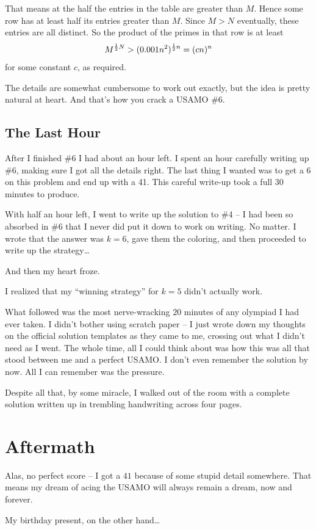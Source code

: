 \documentclass[11pt]{scrartcl}
\begin{document}
That means at the half the entries in the table are greater than $M$.
Hence some row has at least half its entries greater than $M$.
Since $M > N$ eventually, these entries are all distinct. So the product of the primes in that row is at least
\[ M^{\frac{1}{2} N} > (0.001n^2)^{\frac{1}{2} n} = (cn)^n \]
for some constant $c$, as required.

The details are somewhat cumbersome to work out exactly, but the idea is pretty natural at heart.
And that's how you crack a USAMO \#6.

\subsection{The Last Hour}
After I finished \#6 I had about an hour left.
I spent an hour carefully writing up \#6, making sure I got all the details right.
The last thing I wanted was to get a 6 on this problem and end up with a 41.
This careful write-up took a full 30 minutes to produce.

With half an hour left, I went to write up the solution to \#4 -- I had been so
absorbed in \#6 that I never did put it down to work on writing.
No matter. I wrote that the answer was $k=6$, gave them the coloring,
and then proceeded to write up the strategy\dots

And then my heart froze.

I realized that my ``winning strategy'' for $k=5$ didn't actually work.

What followed was the most nerve-wracking $20$ minutes of any olympiad I had ever taken.
I didn't bother using scratch paper -- I just wrote down my thoughts on the
official solution templates as they came to me, crossing out what I didn't need as I went.
The whole time, all I could think about was how this was all that stood between me and a perfect USAMO.
I don't even remember the solution by now. All I can remember was the pressure.

Despite all that, by some miracle,
I walked out of the room with a complete solution written up in trembling handwriting across four pages.

\section{Aftermath}
Alas, no perfect score -- I got a $41$ because of some stupid detail somewhere.
That means my dream of acing the USAMO will always remain a dream, now and forever.

My birthday present, on the other hand\dots
\end{document}
